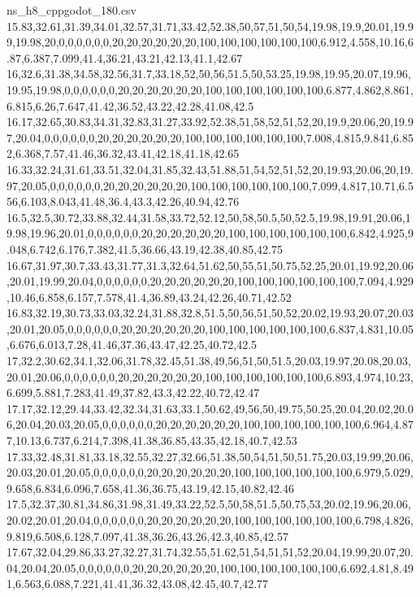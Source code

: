 \begin{filecontents*}[overwrite]{ns_h8_cppgodot_180.csv}
15.83,32.61,31.39,34.01,32.57,31.71,33.42,52.38,50,57,51,50,54,19.98,19.9,20.01,19.99,19.98,20,0,0,0,0,0,0,20,20,20,20,20,20,100,100,100,100,100,100,6.912,4.558,10.16,6.87,6.387,7.099,41.4,36.21,43.21,42.13,41.1,42.67
16,32.6,31.38,34.58,32.56,31.7,33.18,52,50,56,51.5,50,53.25,19.98,19.95,20.07,19.96,19.95,19.98,0,0,0,0,0,0,20,20,20,20,20,20,100,100,100,100,100,100,6.877,4.862,8.861,6.815,6.26,7.647,41.42,36.52,43.22,42.28,41.08,42.5
16.17,32.65,30.83,34.31,32.83,31.27,33.92,52.38,51,58,52,51,52,20,19.9,20.06,20,19.97,20.04,0,0,0,0,0,0,20,20,20,20,20,20,100,100,100,100,100,100,7.008,4.815,9.841,6.852,6.368,7.57,41.46,36.32,43.41,42.18,41.18,42.65
16.33,32.24,31.61,33.51,32.04,31.85,32.43,51.88,51,54,52,51,52,20,19.93,20.06,20,19.97,20.05,0,0,0,0,0,0,20,20,20,20,20,20,100,100,100,100,100,100,7.099,4.817,10.71,6.556,6.103,8.043,41.48,36.4,43.3,42.26,40.94,42.76
16.5,32.5,30.72,33.88,32.44,31.58,33.72,52.12,50,58,50.5,50,52.5,19.98,19.91,20.06,19.98,19.96,20.01,0,0,0,0,0,0,20,20,20,20,20,20,100,100,100,100,100,100,6.842,4.925,9.048,6.742,6.176,7.382,41.5,36.66,43.19,42.38,40.85,42.75
16.67,31.97,30.7,33.43,31.77,31.3,32.64,51.62,50,55,51,50.75,52.25,20.01,19.92,20.06,20.01,19.99,20.04,0,0,0,0,0,0,20,20,20,20,20,20,100,100,100,100,100,100,7.094,4.929,10.46,6.858,6.157,7.578,41.4,36.89,43.24,42.26,40.71,42.52
16.83,32.19,30.73,33.03,32.24,31.88,32.8,51.5,50,56,51,50,52,20.02,19.93,20.07,20.03,20.01,20.05,0,0,0,0,0,0,20,20,20,20,20,20,100,100,100,100,100,100,6.837,4.831,10.05,6.676,6.013,7.28,41.46,37.36,43.47,42.25,40.72,42.5
17,32.2,30.62,34.1,32.06,31.78,32.45,51.38,49,56,51,50,51.5,20.03,19.97,20.08,20.03,20.01,20.06,0,0,0,0,0,0,20,20,20,20,20,20,100,100,100,100,100,100,6.893,4.974,10.23,6.699,5.881,7.283,41.49,37.82,43.3,42.22,40.72,42.47
17.17,32.12,29.44,33.42,32.34,31.63,33.1,50.62,49,56,50,49.75,50.25,20.04,20.02,20.06,20.04,20.03,20.05,0,0,0,0,0,0,20,20,20,20,20,20,100,100,100,100,100,100,6.964,4.877,10.13,6.737,6.214,7.398,41.38,36.85,43.35,42.18,40.7,42.53
17.33,32.48,31.81,33.18,32.55,32.27,32.66,51.38,50,54,51,50,51.75,20.03,19.99,20.06,20.03,20.01,20.05,0,0,0,0,0,0,20,20,20,20,20,20,100,100,100,100,100,100,6.979,5.029,9.658,6.834,6.096,7.658,41.36,36.75,43.19,42.15,40.82,42.46
17.5,32.37,30.81,34.86,31.98,31.49,33.22,52.5,50,58,51.5,50.75,53,20.02,19.96,20.06,20.02,20.01,20.04,0,0,0,0,0,0,20,20,20,20,20,20,100,100,100,100,100,100,6.798,4.826,9.819,6.508,6.128,7.097,41.38,36.26,43.26,42.3,40.85,42.57
17.67,32.04,29.86,33.27,32.27,31.74,32.55,51.62,51,54,51,51,52,20.04,19.99,20.07,20.04,20.04,20.05,0,0,0,0,0,0,20,20,20,20,20,20,100,100,100,100,100,100,6.692,4.81,8.491,6.563,6.088,7.221,41.41,36.32,43.08,42.45,40.7,42.77

\end{filecontents*}
